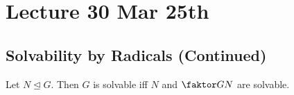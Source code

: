 \documentclass[notoc,notitlepage,nobib]{tufte-book}
\begin{document}



\chapter{Lecture 30 Mar 25th}%
\label{chp:lecture_30_mar_25th}

\section{Solvability by Radicals (Continued)}%
\label{sec:solvability_by_radicals_continued}

\begin{propo}\label{propo:converse_of_subgroups_of_solvable_groups_are_solvable}
  Let $N \trianglelefteq G$. Then $G$ is solvable iff $N$ and $\quotient{G}{N}$
  are solvable.
\end{propo}
\end{document}
